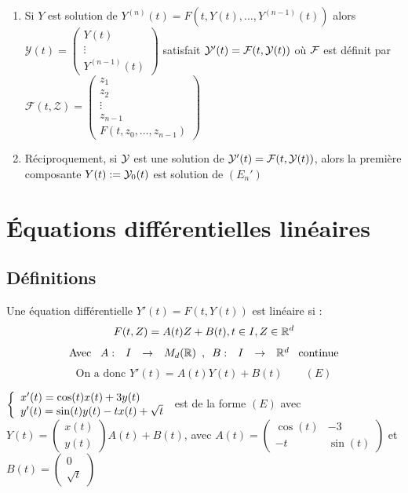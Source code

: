 \documentclass[]{report}
\begin{document}
\begin{prop}
    \begin{enumerate}
        \item Si $Y$ est solution de $Y^{(n)}(t)=F(t,Y(t),\dots,Y^{(n-1)}(t))$ alors $\mathcal{Y}(t)=\begin{pmatrix}
            Y(t)\\
            \vdots\\
            Y^{(n-1)}(t)
        \end{pmatrix}$ satisfait $\mathcal{Y}'(t)=\mathcal{F}(t,\mathcal{Y}(t))$ où $\mathcal{F}$ est définit par $\mathcal{F}(t,\mathcal{Z})=\begin{pmatrix}
    z_1\\
    z_2\\
    \vdots\\
    z_{n-1}\\
    F(t,z_0,\dots,z_{n-1})
\end{pmatrix}$
        \item Réciproquement, si $\mathcal{Y}$ est une solution de $\mathcal{Y}'(t)=\mathcal{F}(t,\mathcal{Y}(t))$, alors la première composante $Y(t):=\mathcal{Y}_0(t)$ est solution de $(E_n')$
    \end{enumerate}
\end{prop}

\chapter{Équations différentielles linéaires}

\section{Définitions}

\begin{df}
    Une équation différentielle $Y'(t)=F(t,Y(t))$ est linéaire si :
    $$F(t,Z)=A(t)Z+B(t),t\in I,Z\in\mathbb{R}^d$$
    $$\text{Avec }\begin{array}{ccccc} A : & I & \to & M_d(\mathbb{R}) \end{array},\begin{array}{ccccc} B : & I & \to & \mathbb{R}^d \end{array}\text{ continue}$$
    $$\text{On a donc }Y'(t)=A(t)Y(t)+B(t)\qquad (E)$$
\end{df}

\begin{ex}
    $\left\{\begin{array}{ll} x'(t)=\cos(t)x(t)+3y(t)\\
    y'(t)=\sin(t)y(t)-tx(t)+\sqrt{t} \end{array} \right.$   est de la forme $(E)$ avec $Y(t)=\begin{pmatrix}
        x(t)\\
        y(t)
    \end{pmatrix}A(t)+B(t)$, avec $A(t)=\begin{pmatrix}
        \cos(t)&-3\\
        -t&\sin(t)
    \end{pmatrix}$ et $B(t)=\begin{pmatrix}
        0\\
        \sqrt{t}
    \end{pmatrix}$ 
\end{ex}
\end{document}
